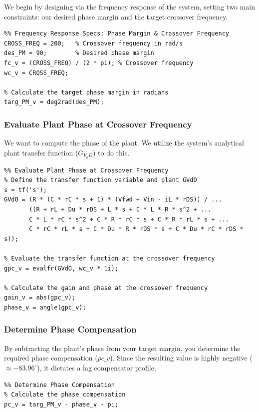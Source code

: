We begin by designing via the frequency response of the system, setting two main constraints: our desired phase margin and the target crossover frequency.

\begin{lstlisting}
%% Frequency Response Specs: Phase Margin & Crossover Frequency
CROSS_FREQ = 200;   % Crossover frequency in rad/s
des_PM = 90;        % Desired phase margin
fc_v = (CROSS_FREQ) / (2 * pi); % Crossover frequency
wc_v = CROSS_FREQ;

% Calculate the target phase margin in radians
targ_PM_v = deg2rad(des_PM);
\end{lstlisting}

\subsubsection{Evaluate Plant Phase at Crossover Frequency}
We want to compute the phase of the plant. We utilize the system's analytical plant transfer function ($G_{V_oD}$) to do this.

\begin{lstlisting}
%% Evaluate Plant Phase at Crossover Frequency
% Define the transfer function variable and plant GVdO
s = tf('s');
GVdO = (R * (C * rC * s + 1) * (Vfwd + Vin - iL * rDS)) / ...
       ((R + rL + Du * rDS + L * s + C * L * R * s^2 + ...
       C * L * rC * s^2 + C * R * rC * s + C * R * rL * s + ...
       C * rC * rL * s + C * Du * R * rDS * s + C * Du * rC * rDS * s));

% Evaluate the transfer function at the crossover frequency
gpc_v = evalfr(GVdO, wc_v * 1i);

% Calculate the gain and phase at the crossover frequency
gain_v = abs(gpc_v);
phase_v = angle(gpc_v);
\end{lstlisting}

\subsubsection{Determine Phase Compensation}
By subtracting the plant's phase from your target margin, you determine the required phase compensation ($pc\_v$). Since the resulting value is highly negative ($\approx -83.96^\circ$), it dictates a lag compensator profile.

\begin{lstlisting}
%% Determine Phase Compensation
% Calculate the phase compensation
pc_v = targ_PM_v - phase_v - pi;
\end{lstlisting}

